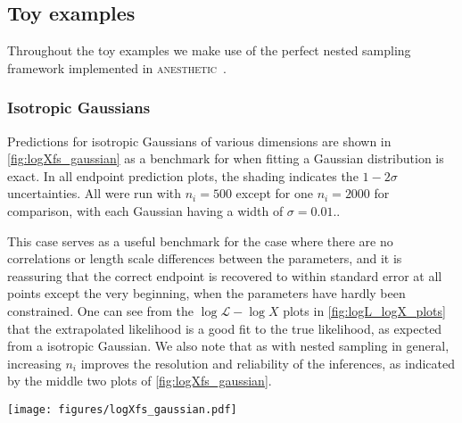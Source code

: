 \documentclass[usenatbib]{mnras}
\newcommand{\nlive}{n_i}
\newcommand{\Like}{\mathcal{L}}
\begin{document}
\subsection{Toy examples}\label{sec:logXfs_toy}
Throughout the toy examples we make use of the perfect nested sampling~\citep{Keeton_2011,2018BayAn..13..873H} framework implemented in \textsc{anesthetic}~\citep{anesthetic}.
\subsubsection{Isotropic Gaussians}
Predictions for isotropic Gaussians of various dimensions are shown in \cref{fig:logXfs_gaussian} as a benchmark for when fitting a Gaussian distribution is exact. In all endpoint prediction plots, the shading indicates the $1-2\sigma$ uncertainties. All were run with $\nlive = 500$ except for one $\nlive=2000$ for comparison, with each Gaussian having a width of $\sigma = 0.01$.. 
\par
This case serves as a useful benchmark for the case where there are no correlations or length scale differences between the parameters, and it is reassuring that the correct endpoint is recovered to within standard error at all points except the very beginning, when the parameters have hardly been constrained. One can see from the $\log\Like-\log X$ plots in \cref{fig:logL_logX_plots} that the extrapolated likelihood is a good fit to the true likelihood, as expected from a isotropic Gaussian. We also note that as with nested sampling in general, increasing $\nlive$ improves the resolution and reliability of the inferences, as indicated by the middle two plots of \cref{fig:logXfs_gaussian}.
\begin{figure*}
\begin{center}
    \texttt{[image: figures/logXfs\_gaussian.pdf]}
\end{center}
\caption{Endpoint predictions for a isotropic Gaussian run with $\nlive=500$ (except for the third plot from left). The true endpoints are shown in dotted red, while the estimates with their $1-2\sigma$ uncertainties are shaded in blue. Progress is measured in terms of the compression $-\log X$ along the x-axis, while the estimates on the y-axis are in terms of the predicted final compression $-\log \hat{X}_\mathrm{f}$. The correct endpoint is obtained for all but the earliest iterations, and the uncertainty is controlled by the number of live points, which can be seen from the two $d = 16$ plots.}
\label{fig:logXfs_gaussian}
\end{figure*}
\end{document}
